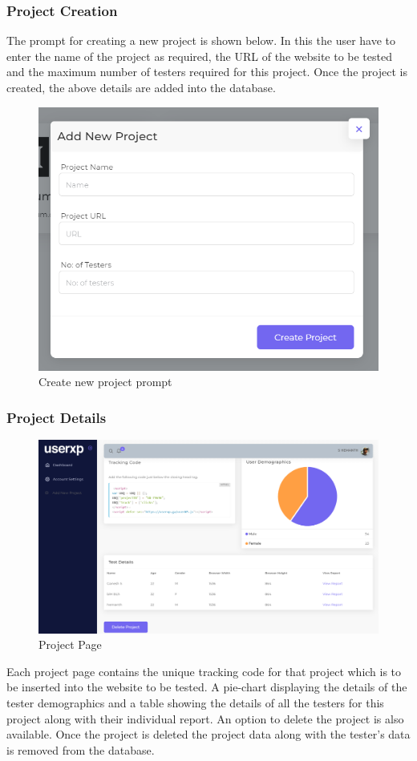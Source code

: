 \documentclass[hidelinks,12pt,a4paper,final]{extreport}
\begin{document}
\subsubsection{Project Creation}
The prompt for creating a new project is shown below. In this the user have to enter the name of the project as required, the URL of the website to be tested and the maximum number of testers required for this project. Once the project is created, the above details are added into the database.
\begin{figure}[H]
    \centering
    \includegraphics[scale=.8]{create-project.png}
    \caption{Create new project prompt}
\end{figure}
\subsubsection{Project Details}
\begin{figure}[H]
    \centering
    \includegraphics[width=\linewidth]{project-page.png}
    \caption{Project Page}
\end{figure}
Each project page contains the unique tracking code for that project which is to be inserted into the website to be tested.
A pie-chart displaying the details of the tester demographics and a table showing the details of all the testers for this project along with their individual report.
An option to delete the project is also available. Once the project is deleted the project data along with the tester’s data is removed from the database.
\end{document}
